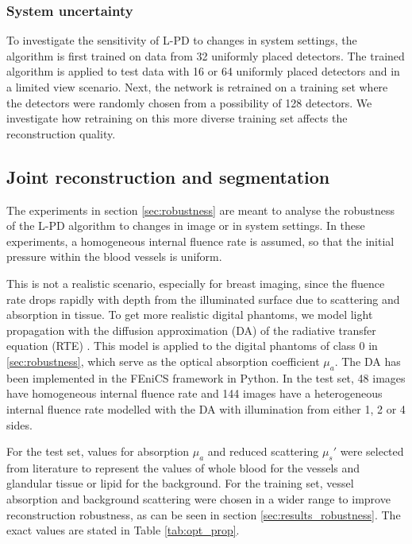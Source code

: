 \documentclass[journal]{IEEEtran}
\begin{document}
\subsubsection{System uncertainty}\label{sec:system_uncertainty}
To investigate the sensitivity of L-PD to changes in system settings, the algorithm is first trained on data from 32 uniformly placed detectors. The trained algorithm is applied to test data with 16 or 64 uniformly placed detectors and in a limited view scenario. Next, the network is retrained on a training set where the detectors were randomly chosen from a possibility of 128 detectors. We investigate how retraining on this more diverse training set affects the reconstruction quality.

\subsection{Joint reconstruction and segmentation}\label{sec:segmentation}
The experiments in section \ref{sec:robustness} are meant to analyse the robustness of the L-PD algorithm to changes in image or in system settings. In these experiments, a homogeneous internal fluence rate is assumed, so that the initial pressure within the blood vessels is uniform. 

This is not a realistic scenario, especially for breast imaging, since the fluence rate drops rapidly with depth from the illuminated surface due to scattering and absorption in tissue. To get more realistic digital phantoms, we model light propagation with the diffusion approximation (DA) of the radiative transfer equation (RTE) \cite{Schweiger1993}. This model is applied to the digital phantoms of class 0 in \ref{sec:robustness}, which serve as the optical absorption coefficient $\mu_a$. The DA has been implemented in the FEniCS framework \cite{Alnaes2014} in Python. In the test set, 48 images have homogeneous internal fluence rate and 144 images have a heterogeneous internal fluence rate modelled with the DA with illumination from either 1, 2 or 4 sides. 

For the test set, values for absorption $\mu_a$ and reduced scattering $\mu_s'$ were selected from literature \cite{Jacques2013} to represent the values of whole blood for the vessels and glandular tissue or lipid for the background. For the training set, vessel absorption and background scattering were chosen in a wider range to improve reconstruction robustness, as can be seen in section \ref{sec:results_robustness}. The exact values are stated in Table \ref{tab:opt_prop}.
\end{document}

